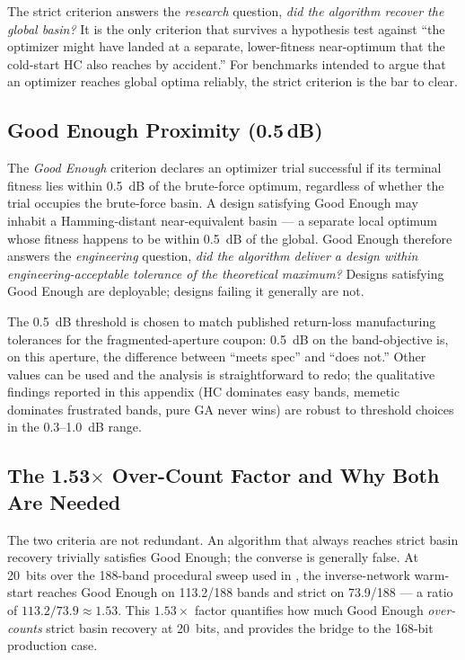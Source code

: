 The strict criterion answers the \emph{research} question, \emph{did
the algorithm recover the global basin?} It is the only criterion
that survives a hypothesis test against ``the optimizer might have
landed at a separate, lower-fitness near-optimum that the cold-start
HC also reaches by accident.'' For benchmarks intended to argue
that an optimizer reaches global optima reliably, the strict
criterion is the bar to clear.

\subsection{Good Enough Proximity (0.5\,dB)}

The \emph{Good Enough} criterion declares an optimizer trial
successful if its terminal fitness lies within 0.5~dB of the
brute-force optimum, regardless of whether the trial occupies the
brute-force basin. A design satisfying Good Enough may inhabit a
Hamming-distant near-equivalent basin --- a separate local optimum
whose fitness happens to be within 0.5~dB of the global. Good
Enough therefore answers the \emph{engineering} question, \emph{did
the algorithm deliver a design within engineering-acceptable
tolerance of the theoretical maximum?} Designs satisfying Good
Enough are deployable; designs failing it generally are not.

The 0.5~dB threshold is chosen to match published return-loss
manufacturing tolerances for the fragmented-aperture coupon: 0.5~dB
on the band-objective is, on this aperture, the difference between
``meets spec'' and ``does not.'' Other values can be used and the
analysis is straightforward to redo; the qualitative findings
reported in this appendix (HC dominates easy bands, memetic
dominates frustrated bands, pure GA never wins) are robust to
threshold choices in the 0.3--1.0~dB range.

\subsection{The 1.53$\times$ Over-Count Factor and Why Both Are Needed}

The two criteria are not redundant. An algorithm that always reaches
strict basin recovery trivially satisfies Good Enough; the converse
is generally false. At 20~bits over the 188-band procedural sweep
used in \cite{Maloney2026Paper1}, the inverse-network warm-start
reaches Good Enough on 113.2/188 bands and strict on 73.9/188 ---
a ratio of $113.2 / 73.9 \approx 1.53$. This $1.53\times$ factor
quantifies how much Good Enough \emph{over-counts} strict basin
recovery at 20~bits, and provides the bridge to the 168-bit
production case.

